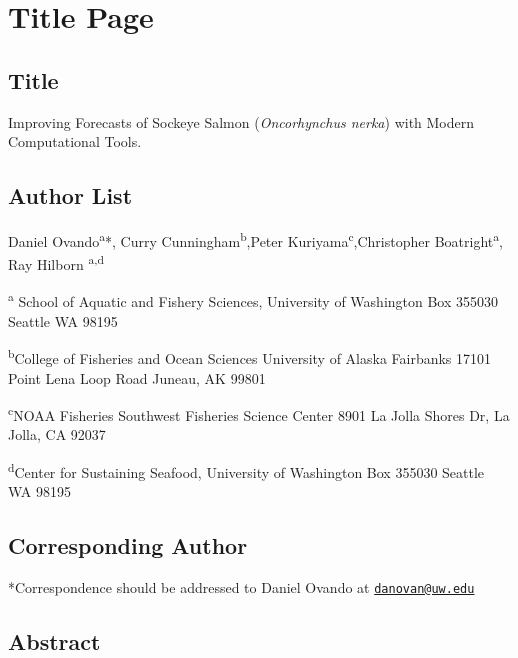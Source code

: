 \documentclass[
]{article}
\author{}
\date{\vspace{-2.5em}}
\begin{document}
\newpage

\hypertarget{title-page}{%
\section*{Title Page}\label{title-page}}

\hypertarget{title}{%
\subsection*{Title}\label{title}}

Improving Forecasts of Sockeye Salmon (\emph{Oncorhynchus nerka}) with Modern Computational Tools.

\hypertarget{author-list}{%
\subsection*{Author List}\label{author-list}}

Daniel Ovando\textsuperscript{a}*, Curry Cunningham\textsuperscript{b},Peter Kuriyama\textsuperscript{c},Christopher Boatright\textsuperscript{a}, Ray Hilborn \textsuperscript{a,d}

\textsuperscript{a} School of Aquatic and Fishery Sciences, University of Washington Box 355030 Seattle WA 98195

\textsuperscript{b}College of Fisheries and Ocean Sciences University of Alaska Fairbanks 17101 Point Lena Loop Road Juneau, AK 99801

\textsuperscript{c}NOAA Fisheries Southwest Fisheries Science Center 8901 La Jolla Shores Dr, La Jolla, CA 92037

\textsuperscript{d}Center for Sustaining Seafood, University of Washington Box 355030 Seattle WA 98195

\hypertarget{corresponding-author}{%
\subsection*{Corresponding Author}\label{corresponding-author}}

*Correspondence should be addressed to Daniel Ovando at \href{mailto:danovan@uw.edu}{\nolinkurl{danovan@uw.edu}}

\newpage

\hypertarget{abstract}{%
\subsection*{Abstract}\label{abstract}}
\end{document}
